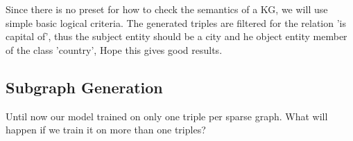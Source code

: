 Since there is no preset for how to check the semantics of a KG, we will use simple basic logical criteria.
The generated triples are filtered for the relation 'is capital of', thus the subject entity should be a city and he object entity member of the class 'country',
Hope this gives good results.

\subsection{Subgraph Generation}
Until now our model trained on only one triple per sparse graph. What will happen if we train it on more than one triples?
